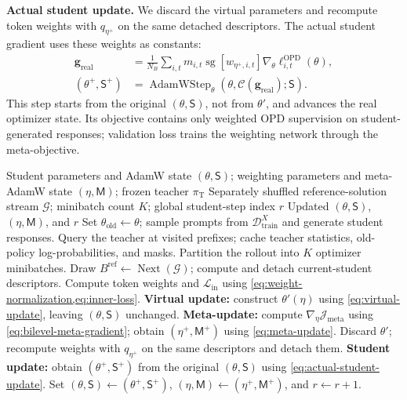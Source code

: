 \documentclass{article}
\theoremstyle{plain}
\theoremstyle{definition}
\theoremstyle{remark}
\newcommand{\Dtrain}{\mathcal{D}_{\mathrm{train}}}
\begin{document}
\textbf{Actual student update.}
We discard the virtual parameters and recompute token weights with \(q_{\eta^+}\) on the same detached descriptors. The actual student gradient uses these weights as constants:
\begin{equation}
\begin{aligned}
    \boldsymbol g_{\mathrm{real}}
    &=\frac{1}{N_B}\sum_{i,t}m_{i,t}
      \operatorname{sg}[w_{\eta^+,i,t}]
      \nabla_\theta\ell^{\mathrm{OPD}}_{i,t}(\theta),\\
    (\theta^+,\mathsf S^+)
    &=\operatorname{AdamWStep}_{\theta}
      (\theta,\mathcal C(\boldsymbol g_{\mathrm{real}});\mathsf S).
\end{aligned}
\label{eq:actual-student-update}
\end{equation}
This step starts from the original \((\theta,\mathsf S)\), not from \(\theta'\), and advances the real optimizer state. 
Its objective contains only weighted OPD supervision on student-generated responses; validation loss trains the weighting network through the meta-objective.


\begin{algorithm}[H]
\caption{One MetaOPD rollout round}
\label{alg:metaopd}
\begin{algorithmic}[1]
\REQUIRE Student parameters and AdamW state \((\theta,\mathsf S)\); weighting parameters and meta-AdamW state \((\eta,\mathsf M)\); frozen teacher \(\pi_{\mathrm T}\)
\REQUIRE Separately shuffled reference-solution stream \(\mathcal G\); minibatch count \(K\); global student-step index \(r\)
\ENSURE Updated \((\theta,\mathsf S)\), \((\eta,\mathsf M)\), and \(r\)
\STATE Set \(\theta_{\mathrm{old}}\leftarrow\theta\); sample prompts from \(\Dtrain^X\) and generate student responses.
\STATE Query the teacher at visited prefixes; cache teacher statistics, old-policy log-probabilities, and masks.
\STATE Partition the rollout into \(K\) optimizer minibatches.
    \STATE Draw \(B^{\mathrm{ref}}\leftarrow\operatorname{Next}(\mathcal G)\); compute and detach current-student descriptors.
    \STATE Compute token weights and \(\mathcal L_{\mathrm{in}}\) using \cref{eq:weight-normalization,eq:inner-loss}.
    \STATE \textbf{Virtual update:} construct \(\theta'(\eta)\) using \cref{eq:virtual-update}, leaving \((\theta,\mathsf S)\) unchanged.
    \STATE \textbf{Meta-update:} compute \(\nabla_\eta\mathcal J_{\mathrm{meta}}\) using \cref{eq:bilevel-meta-gradient}; obtain \((\eta^+,\mathsf M^+)\) using \cref{eq:meta-update}.
    \STATE Discard \(\theta'\); recompute weights with \(q_{\eta^+}\) on the same descriptors and detach them.
    \STATE \textbf{Student update:} obtain \((\theta^+,\mathsf S^+)\) from the original \((\theta,\mathsf S)\) using \cref{eq:actual-student-update}.
    \STATE Set \((\theta,\mathsf S)\leftarrow(\theta^+,\mathsf S^+)\), \((\eta,\mathsf M)\leftarrow(\eta^+,\mathsf M^+)\), and \(r\leftarrow r+1\).
\ENDFOR
\end{algorithmic}
\end{algorithm}
\end{document}
